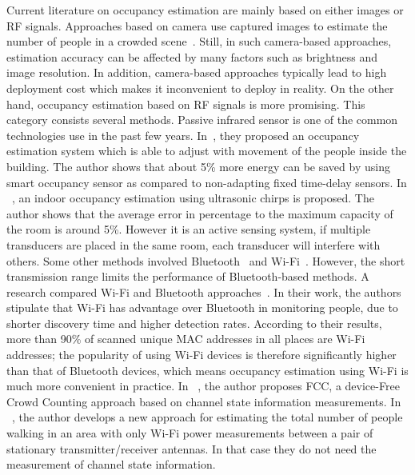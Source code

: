 Current literature on occupancy estimation are mainly based on either images or RF signals. Approaches based on camera use captured images to estimate the number of people in a crowded scene~\cite{Ma_2013_CVPR,Pe_count,li2008estimating}.
Still, in such camera-based approaches, estimation accuracy can be affected by many factors such as brightness and image resolution.
In addition, camera-based approaches typically lead to high deployment cost which makes it inconvenient to deploy in reality.
On the other hand, occupancy estimation based on RF signals is more promising. This category consists several methods. 
Passive infrared sensor is one of the common technologies use in the past few years. In~\cite{Garg200081}, they proposed an occupancy estimation system which is able to adjust with movement of the people inside the building. The author shows  that about 5\% more energy can be saved by using smart occupancy sensor as compared to non-adapting fixed time-delay sensors.
In ~\cite{Shih:2015:OEU:2735960.2735969}, an indoor occupancy estimation using ultrasonic chirps is proposed. The author shows that the average error in
percentage to the maximum capacity of the room is around 5\%. However it is an active sensing system, if multiple transducers are placed in the same room, each transducer will interfere with others.
Some other methods involved Bluetooth~\cite{B_ad_hoc} and Wi-Fi~\cite{W_power}. However, the short transmission range limits the performance of Bluetooth-based methods.
A research compared Wi-Fi and Bluetooth approaches~\cite{quteprints71808}.
In their work, the authors stipulate that Wi-Fi has advantage over Bluetooth in monitoring people, due to shorter discovery time and higher detection rates.
According to their results, more than 90\% of scanned unique MAC addresses in all places are Wi-Fi addresses; the popularity of using Wi-Fi devices is therefore significantly higher than that of Bluetooth devices, which means occupancy estimation using Wi-Fi is much more convenient in practice.
In ~\cite{6847958}, the author proposes FCC, a device-Free Crowd Counting approach based on channel state information measurements. In ~\cite{7102673},  the author develops a new approach for estimating the total number of people walking in an area with only Wi-Fi power measurements between a pair of stationary transmitter/receiver antennas. In that case they do not need the measurement of channel state information.

